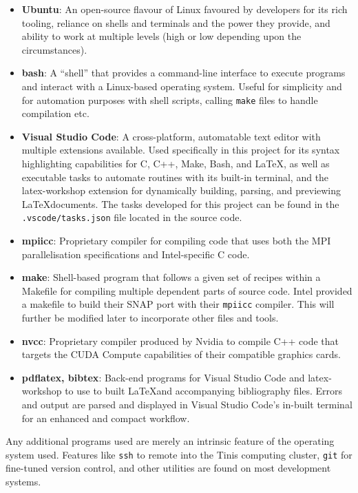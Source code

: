 \documentclass[conference]{IEEEtran}
\begin{document}
\begin{itemize}
    \item \textbf{Ubuntu}: An open-source flavour of Linux favoured by developers for its rich tooling, reliance on shells and terminals and the power they provide, and ability to work at multiple levels (high or low depending upon the circumstances).
    \item \textbf{bash}: A ``shell'' that provides a command-line interface to execute programs and interact with a Linux-based operating system. Useful for simplicity and for automation purposes with shell scripts, calling \texttt{make} files to handle compilation etc.
    \item \textbf{Visual Studio Code}: A cross-platform, automatable text editor with multiple extensions available. Used specifically in this project for its syntax highlighting capabilities for C, C++, Make, Bash, and \LaTeX, as well as executable tasks to automate routines with its built-in terminal, and the latex-workshop extension for dynamically building, parsing, and previewing \LaTeX documents. The tasks developed for this project can be found in the \texttt{.vscode/tasks.json} file located in the source code.
    \item \textbf{mpiicc}: Proprietary compiler for compiling code that uses both the MPI parallelisation specifications and Intel-specific C code.
    \item \textbf{make}: Shell-based program that follows a given set of recipes within a Makefile for compiling multiple dependent parts of source code. Intel provided a makefile to build their SNAP port with their \texttt{mpiicc} compiler. This will further be modified later to incorporate other files and tools.
    \item \textbf{nvcc}: Proprietary compiler produced by Nvidia to compile C++ code that targets the CUDA Compute capabilities of their compatible graphics cards.
    \item \textbf{pdflatex, bibtex}: Back-end programs for Visual Studio Code and latex-workshop to use to built \LaTeX and accompanying bibliography files. Errors and output are parsed and displayed in Visual Studio Code's in-built terminal for an enhanced and compact workflow.
\end{itemize}

Any additional programs used are merely an intrinsic feature of the operating system used. Features like \texttt{ssh} to remote into the Tinis computing cluster, \texttt{git} for fine-tuned version control, and other utilities are found on most development systems.
\end{document}
